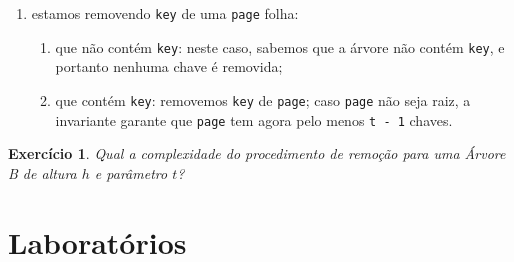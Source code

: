 \documentclass[11pt]{article}
\newtheorem{exercicio}{Exercício}
\begin{document}
\begin{enumerate}
\begin{enumerate}
\begin{enumerate}
\begin{enumerate}
{                1]}, caso \texttt{child[i - 1]} não seja um filho válido;
\end{enumerate}
\end{enumerate}
\item que contém \texttt{key} como \texttt{key[i]}:
\begin{enumerate}
\item caso \texttt{child[i]} tenha mais que \texttt{t - 1} chaves:
encontramos o predecessor de \texttt{key} em \texttt{child[i]}, digamos
\texttt{predKey}; sobrescrevemos \texttt{key} com \texttt{predKey} e
deletamos, recursivamente, \texttt{predKey} de \texttt{child[i]};
\item caso \texttt{child[i + 1]} tenha mais que \texttt{t - 1} chaves:
análogo ao caso anterior, mas em relação ao sucessor de
\texttt{key} em \texttt{child[i + 1]};
\item \label{org59412f0} caso ambos \texttt{child[i]} e
\texttt{child[i + 1]} tenham \texttt{t - 1} chaves: os números de
chaves e de filhos de \texttt{page} diminuem em 1 quando fazemos
o \emph{merge} de \texttt{child[i]}, \texttt{key[i]} e \texttt{child[i + 1]},
criando um novo filho de \texttt{page} com \texttt{2t - 1} chaves que
será \texttt{child[i]}; as chaves de \texttt{key[i + 1]} em diante
sofrem um \emph{shift} para a ``esquerda''; agora podemos
remover \texttt{key} de \texttt{child[i]};
\end{enumerate}
\end{enumerate}
\item estamos removendo \texttt{key} de uma \texttt{page} folha:
\begin{enumerate}
\item que não contém \texttt{key}: neste caso, sabemos que a árvore não
contém \texttt{key}, e portanto nenhuma chave é removida;
\item que contém \texttt{key}: removemos \texttt{key} de \texttt{page}; caso \texttt{page} não
seja raiz, a invariante garante que \texttt{page} tem agora pelo
menos \texttt{t - 1} chaves.
\end{enumerate}
\end{enumerate}

\begin{exercicio}
Qual a complexidade do procedimento de remoção para uma Árvore B
de altura \(h\) e parâmetro \(t\)?
\end{exercicio}

\pagebreak

\section{Laboratórios}
\label{sec:orgbc802ad}
\end{document}
